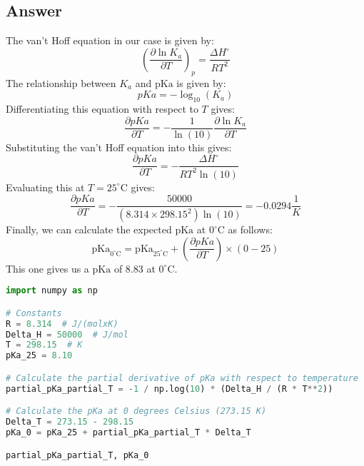 \documentclass[12pt]{article}
\begin{document}
\subsection{Answer}
The van't Hoff equation in our case is given by:
\begin{equation}
  \left( \frac{\partial \ln K_{a}}{\partial T} \right) _{p} = \frac{\Delta H^{\circ}}{RT^{2}}
\end{equation}
The relationship between $K_{a}$ and $\mathrm{pKa}$ is given by:
\begin{equation}
  pKa = -\log_{10}(K_{a})
\end{equation}
Differentiating this equation with respect to $T$ gives:
\begin{equation}
  \frac{\partial pKa}{\partial T} = - \frac{1}{\ln(10)} \frac{\partial \ln K_{a}}{\partial T}
\end{equation}
Substituting the van't Hoff equation into this gives:
\begin{equation}
  \frac{\partial pKa}{\partial T} = - \frac{\Delta H^{\circ}}{RT^{2} \ln(10)}
\end{equation}
Evaluating this at $T=25^{\circ} \mathrm{C}$ gives:
\begin{equation}
  \frac{\partial pKa}{\partial T} = - \frac{50000}{(8.314 \times 298.15^{2}) \ln(10)} = -0.0294 \frac{1}{K}
\end{equation}
Finally, we can calculate the expected $\mathrm{pKa}$ at $0^{\circ} \mathrm{C}$ as follows:
\begin{equation}
  \mathrm{pKa}_{0^{\circ} \mathrm{C}} = \mathrm{pKa}_{25^{\circ} \mathrm{C}} + \left( \frac{\partial pKa}{\partial T} \right) \times (0 - 25)
\end{equation}
This one gives us a $\mathrm{pKa}$ of $8.83$ at $0^{\circ} \mathrm{C}$.
\begin{lstlisting}[language=Python]
import numpy as np

# Constants
R = 8.314  # J/(molxK)
Delta_H = 50000  # J/mol
T = 298.15  # K
pKa_25 = 8.10

# Calculate the partial derivative of pKa with respect to temperature
partial_pKa_partial_T = -1 / np.log(10) * (Delta_H / (R * T**2))

# Calculate the pKa at 0 degrees Celsius (273.15 K)
Delta_T = 273.15 - 298.15
pKa_0 = pKa_25 + partial_pKa_partial_T * Delta_T

partial_pKa_partial_T, pKa_0
\end{lstlisting}
\end{document}
